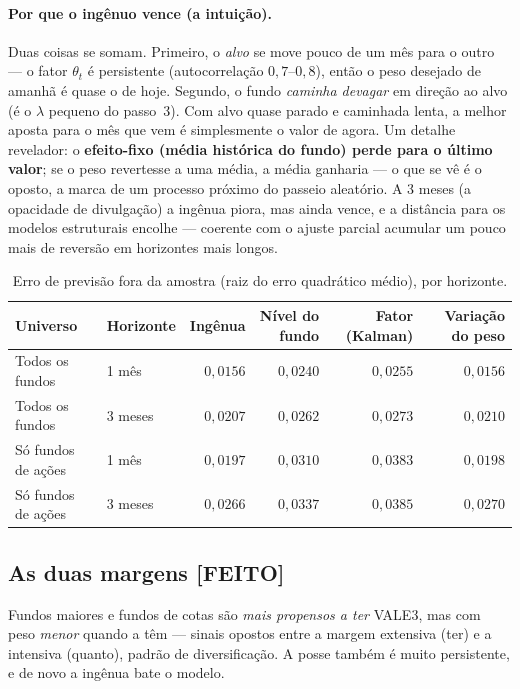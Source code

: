 \documentclass[11pt,a4paper]{article}
\newcommand{\feito}{\textcolor{feitog}{\textbf{[FEITO]}}}
\begin{document}
\paragraph{Por que o ingênuo vence (a intuição).} Duas coisas se somam. Primeiro, o \emph{alvo} se
move pouco de um mês para o outro --- o fator $\theta_t$ é persistente (autocorrelação
$0{,}7$--$0{,}8$), então o peso desejado de amanhã é quase o de hoje. Segundo, o fundo \emph{caminha
devagar} em direção ao alvo (é o $\lambda$ pequeno do passo~3). Com alvo quase parado e caminhada
lenta, a melhor aposta para o mês que vem é simplesmente o valor de agora. Um detalhe revelador:
o \textbf{efeito-fixo (média histórica do fundo) perde para o último valor}; se o peso revertesse a
uma média, a média ganharia --- o que se vê é o oposto, a marca de um processo próximo do passeio
aleatório. A 3 meses (a opacidade de divulgação) a ingênua piora, mas ainda vence, e a distância
para os modelos estruturais encolhe --- coerente com o ajuste parcial acumular um pouco mais de
reversão em horizontes mais longos.

\begin{table}[h]\centering\small
\caption{Erro de previsão fora da amostra (raiz do erro quadrático médio), por horizonte.}
\label{tab:fc}
\begin{tabular}{@{}llrrrr@{}}
\toprule
Universo & Horizonte & Ingênua & Nível do fundo & Fator (Kalman) & Variação do peso \\
\midrule
Todos os fundos      & 1 mês  & $0{,}0156$ & $0{,}0240$ & $0{,}0255$ & $0{,}0156$ \\
Todos os fundos      & 3 meses& $0{,}0207$ & $0{,}0262$ & $0{,}0273$ & $0{,}0210$ \\
Só fundos de ações   & 1 mês  & $0{,}0197$ & $0{,}0310$ & $0{,}0383$ & $0{,}0198$ \\
Só fundos de ações   & 3 meses& $0{,}0266$ & $0{,}0337$ & $0{,}0385$ & $0{,}0270$ \\
\bottomrule
\end{tabular}
\end{table}

\subsection{As duas margens \feito}
Fundos maiores e fundos de cotas são \emph{mais propensos a ter} VALE3, mas com peso \emph{menor}
quando a têm --- sinais opostos entre a margem extensiva (ter) e a intensiva (quanto), padrão de
diversificação. A posse também é muito persistente, e de novo a ingênua bate o modelo.
\end{document}
